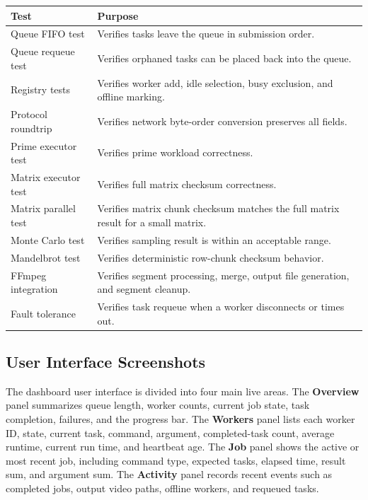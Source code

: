 \documentclass[12pt,a4paper]{article}
\begin{document}
\begin{center}
\begin{tabular}{p{4.4cm}p{8.7cm}}
\toprule
\textbf{Test} & \textbf{Purpose} \\
\midrule
Queue FIFO test & Verifies tasks leave the queue in submission order. \\
Queue requeue test & Verifies orphaned tasks can be placed back into the queue. \\
Registry tests & Verifies worker add, idle selection, busy exclusion, and offline marking. \\
Protocol roundtrip & Verifies network byte-order conversion preserves all fields. \\
Prime executor test & Verifies prime workload correctness. \\
Matrix executor test & Verifies full matrix checksum correctness. \\
Matrix parallel test & Verifies matrix chunk checksum matches the full matrix result for a small matrix. \\
Monte Carlo test & Verifies sampling result is within an acceptable range. \\
Mandelbrot test & Verifies deterministic row-chunk checksum behavior. \\
FFmpeg integration & Verifies segment processing, merge, output file generation, and segment cleanup. \\
Fault tolerance & Verifies task requeue when a worker disconnects or times out. \\
\bottomrule
\end{tabular}
\end{center}

\subsection{User Interface Screenshots}

The dashboard user interface is divided into four main live areas. The \textbf{Overview} panel summarizes queue length, worker counts, current job state, task completion, failures, and the progress bar. The \textbf{Workers} panel lists each worker ID, state, current task, command, argument, completed-task count, average runtime, current run time, and heartbeat age. The \textbf{Job} panel shows the active or most recent job, including command type, expected tasks, elapsed time, result sum, and argument sum. The \textbf{Activity} panel records recent events such as completed jobs, output video paths, offline workers, and requeued tasks.
\end{document}
